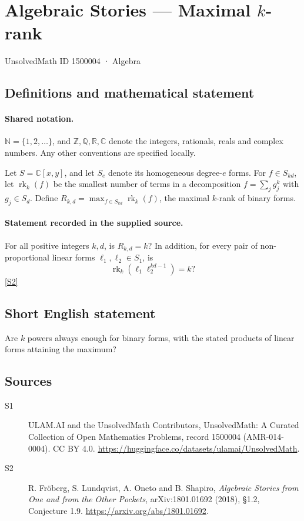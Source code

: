 \documentclass[11pt]{article}
\newcommand{\sref}[2]{\hyperlink{source:#1:#2}{[S#2]}}
\begin{document}
\setcounter{section}{1500003}
\section{Algebraic Stories — Maximal $k$-rank}\label{1500004}
{\small\sffamily UnsolvedMath ID 1500004 · Algebra}
\subsection{Definitions and mathematical statement}

\paragraph{Shared notation.}$\mathbb N=\{1,2,\ldots\}$, and $\mathbb Z,\mathbb Q,\mathbb R,\mathbb C$ denote the integers, rationals, reals and complex numbers. Any other conventions are specified locally.


Let $S=\mathbb C[x,y]$, and let $S_e$ denote its homogeneous degree-$e$ forms. For $f\in S_{kd}$, let $\operatorname{rk}_k(f)$ be the smallest number of terms in a decomposition $f=\sum_jg_j^k$ with $g_j\in S_d$. Define $R_{k,d}=\max_{f\in S_{kd}}\operatorname{rk}_k(f)$, the maximal $k$-rank of binary forms.
\paragraph{Statement recorded in the supplied source.}
For all positive integers $k,d$, is $R_{k,d}=k$? In addition, for every pair of non-proportional linear forms $\ell_1,\ell_2\in S_1$, is
\[\operatorname{rk}_k(\ell_1\ell_2^{kd-1})=k?\] \sref{1500004}{2}
\subsection{Short English statement}
Are $k$ powers always enough for binary forms, with the stated products of linear forms attaining the maximum?
\subsection{Sources}
\begin{description}
\item[\hypertarget{source:1500004:1}{S1}] ULAM.AI and the UnsolvedMath Contributors, UnsolvedMath: A Curated Collection of Open Mathematics Problems, record 1500004 (AMR-014-0004). CC BY 4.0. \url{https://huggingface.co/datasets/ulamai/UnsolvedMath}.
\item[\hypertarget{source:1500004:2}{S2}] R. Fröberg, S. Lundqvist, A. Oneto and B. Shapiro, \emph{Algebraic Stories from One and from the Other Pockets}, arXiv:1801.01692 (2018), §1.2, Conjecture 1.9. \url{https://arxiv.org/abs/1801.01692}.
\end{description}
\label{end:1500004}
\end{document}
